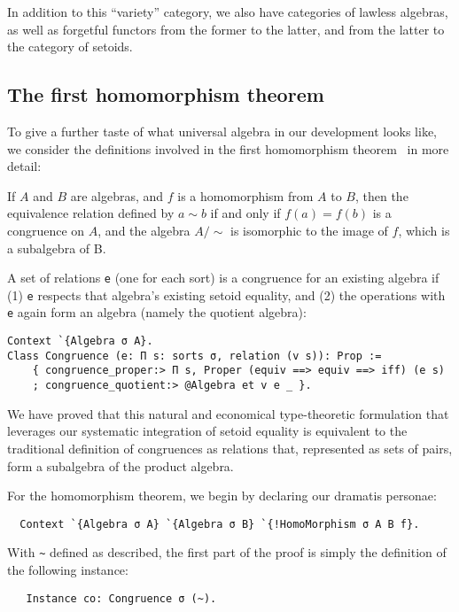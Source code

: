\documentclass[a4paper,10pt,runningheads]{llncs}
\begin{document}
In addition to this ``variety'' category, we also have categories of lawless algebras, as well as forgetful functors from the former to the latter, and from the latter to the category of setoids.

\subsection{The first homomorphism theorem}
\label{homothm}

To give a further taste of what universal algebra in our development looks like, we consider the definitions involved in the first homomorphism theorem~\cite{meinke1993universal} in more detail:
\begin{theorem}
If $A$ and $B$ are algebras, and $f$ is a homomorphism from $A$ to $B$, then the equivalence relation defined by $a\sim b$ if and only if $f(a)=f(b)$ is a congruence on $A$, and the algebra $A/\sim$ is isomorphic to the image of $f$, which is a subalgebra of B.
\end{theorem}

A set of relations \lstinline|e| (one for each sort) is a congruence for an existing algebra if (1) \lstinline|e| respects that algebra's existing setoid equality, and (2) the operations with \lstinline|e| again form an algebra (namely the quotient algebra):
\begin{lstlisting}
Context `{Algebra σ A}.
Class Congruence (e: Π s: sorts σ, relation (v s)): Prop :=
    { congruence_proper:> Π s, Proper (equiv ==> equiv ==> iff) (e s)
    ; congruence_quotient:> @Algebra et v e _ }.
\end{lstlisting}
We have proved that this natural and economical type-theoretic formulation that leverages our systematic integration of setoid equality is equivalent to the traditional definition of congruences as relations that, represented as sets of pairs, form a subalgebra of the product algebra.

For the homomorphism theorem, we begin by declaring our dramatis personae:
\begin{lstlisting}
  Context `{Algebra σ A} `{Algebra σ B} `{!HomoMorphism σ A B f}.
\end{lstlisting}
With \lstinline|~| defined as described, the first part of the proof is simply the definition of the following instance:
\begin{lstlisting}
   Instance co: Congruence σ (~).
\end{lstlisting}
\end{document}
